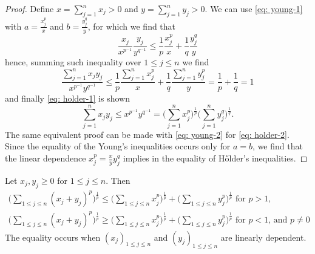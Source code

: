 \begin{proof}
    Define \(x = \sum_{j=1}^n x_j > 0\) and \(y = \sum_{j=1}^n y_j > 0\). We can
    use \cref{eq: young-1} with \(a = \frac {x_j^p} x\) and \(b = \frac {y_j^q}
    y\), for which we find that
    \[
        \frac{x_j}{x^{p^{-1}}} \frac{y_j}{y^{q^{-1}}} \leq \frac 1 p \frac{x_j^p} x
        + \frac 1 q \frac{y_j^q} y
    \]
    hence, summing such inequality over \(1 \leq j \leq n\) we find
    \[
        \frac{\sum_{j=1}^n x_j y_j}{x^{p^{-1}} y^{q^{-1}}} \leq \frac 1 p
        \frac{\sum_{j=1}^n x_j^p} x + \frac 1 q \frac{\sum_{j=1}^n y_j^p} y = \frac
        1 p + \frac 1 q = 1
    \]
    and finally \cref{eq: holder-1} is shown
    \[
        \sum_{j=1}^n x_j y_j \leq x^{p^{-1}} y^{q^{-1}}
        = \Big(\sum_{j=1}^n x_j^p\Big)^{\frac 1 p}
        \Big(\sum_{j=1}^n y_j^q\Big)^{\frac 1 q}.
    \]
    The same equivalent proof can be made with \cref{eq: young-2} for \cref{eq:
        holder-2}. Since the equality of the Young's inequalities occurs only for \(a
    = b\), we find that the linear dependence \(x_j^p = \frac x y y_j^q\) implies
    in the equality of H\H{o}lder's inequalities.
\end{proof}

\begin{proposition}\label{prop: minkowski-ineq}
    Let \(x_j, y_j \geq 0\) for \(1 \leq j \leq n\). Then
    \begin{gather}
        \label{eq: minkowski-1}
        \Big(\sum_{1 \leq j \leq n} (x_j + y_j)^p \Big)^{\frac 1 p}
        \leq \Big(\sum_{1 \leq j \leq n} x_j^p \Big)^{\frac 1 p}
        + \Big(\sum_{1 \leq j \leq n} y_j^p\Big)^{\frac 1 p}
        \text{ for } p > 1,
        \\ \label{eq: minkowski-2}
        \Big(\sum_{1 \leq j \leq n} (x_j + y_j)^p \Big)^{\frac 1 p}
        \geq \Big(\sum_{1 \leq j \leq n} x_j^p \Big)^{\frac 1 p}
        + \Big(\sum_{1 \leq j \leq n} y_j^p\Big)^{\frac 1 p}
        \text{ for } p < 1 \text{, and } p \neq 0
    \end{gather}
    The equality occurs when \((x_j)_{1 \leq j \leq n}\) and \((y_j)_{1 \leq j
            \leq n}\) are linearly dependent.
\end{proposition}

